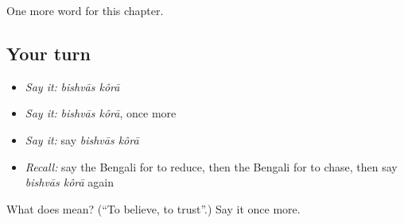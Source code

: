 \begin{grammarlens}[title={What you've built}]
One more word for this chapter.
\end{grammarlens}

\subsection*{Your turn}
\begin{itemize}
\raggedright
  \item \emph{Say it:} \emph{bishvās kôrā}
  \item \emph{Say it:} \emph{bishvās kôrā}, once more
  \item \emph{Say it:} say \emph{bishvās kôrā}
  \item \emph{Recall:} say the Bengali for to reduce, then the Bengali for to chase, then say \emph{bishvās kôrā} again
\end{itemize}

\begin{tcolorbox}[breakable,colback=teal!4,colframe=teal!35!black,title={Before you move on}]
What does   mean? (\textquotedblleft{}To believe, to trust\textquotedblright{}.) Say it once more.
\end{tcolorbox}
